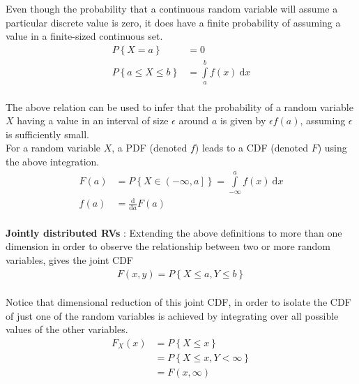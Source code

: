 Even though the probability that a continuous random variable will assume a particular discrete value is zero, it does have a finite probability of assuming a value in a finite-sized continuous set. \\

\begin{align}
	P \left\{X = a \right\} &= 0 \\
	P \left\{ a \leq X \leq b \right\} &= \int\limits_{a}^{b} f(x) \ \mathrm{d}x
\end{align}\\

The above relation can be used to infer that the probability of a random variable $ X $ having a value in an interval of size $ \epsilon $ around $ a $ is given by $ \epsilon f(a) $, assuming $ \epsilon $ is sufficiently small.  \\

For a random variable $ X $, a PDF (denoted $ f $) leads to a CDF (denoted $ F $) using the above integration. \\
\begin{align}
	F(a) &= P \left\{ X \in \left( -\infty, a \right]  \right\} = \int\limits_{-\infty}^{a} f(x) \ \mathrm{d}x \\
	f(a) &= \frac{\mathrm{d}}{\mathrm{d}a} F(a)
\end{align} \\

\textbf{Jointly distributed RVs} : Extending the above definitions to more than one dimension in order to observe the relationship between two or more random variables, gives the joint CDF\\

\begin{align}
	F(x, y) = P \left\{ X \leq a, Y \leq b \right\}
\end{align} \\

Notice that dimensional reduction of this joint CDF, in order to isolate the CDF of just one of the random variables is achieved by integrating over all possible values of the other variables. \\

\begin{align}
	F_X (x) &= P \left\{ X \leq x \right\} \nonumber \\
	&= P \left\{ X \leq x, Y < \infty \right\} \nonumber \\
	&= F(x, \infty)
\end{align} \\

